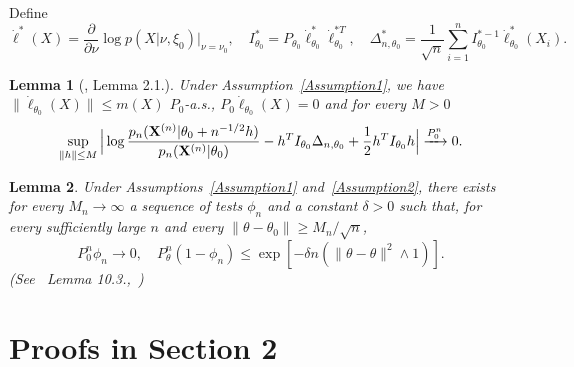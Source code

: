 \documentclass[11pt]{article}
\theoremstyle{plain}
\newtheorem{lemma}{\quad\quad Lemma}
\theoremstyle{definition}
\theoremstyle{remark}
\begin{document}
\begin{appendices}

    Define
$$\dot{\ell}^*(X)=\frac{\partial}{\partial \nu}\log p(X|\nu,\xi_0)\Big|_{\nu=\nu_0}, \quad I^*_{\theta_0}=P_{\theta_0}\dot{\ell}_{\theta_0}^*\dot{\ell}_{\theta_0}^{*T},\quad \Delta_{n,\theta_0}^*
=\frac{1}{\sqrt{n}}\sum_{i=1}^n I_{\theta_0}^{*-1}\dot{\ell}^{*}_{\theta_0}(X_i).
$$

\begin{lemma}[\cite{Kleijn2012The}, Lemma 2.1.]\label{Thm:localExpansion}
    Under Assumption~\ref{Assumption1},
    we have $\|\dot{\ell}_{\theta_0}(X)\|\leq m(X)$ $P_0$-a.s., $P_0 \dot{\ell}_{\theta_0}(X)=0$ and for every $M>0$
    \begin{equation*}
        \sup_{\|h\|\leq M}\Big|
         \log \frac{p_n(\mathbf{X}^{(n)}|\theta_0+n^{-1/2}h)}{p_n(\mathbf{X}^{(n)}|\theta_0)}-h^T I_{\theta_0}\Delta_{n,\theta_0}+\frac{1}{2}h^T I_{\theta_0}h
        \Big|\xrightarrow{P^n_0}0.
    \end{equation*}
\end{lemma}

\begin{lemma}\label{Thm:someTest}
    Under Assumptions~\ref{Assumption1} and~\ref{Assumption2},
    there exists for every $M_n\to \infty$ a sequence of tests $\phi_n$ and a constant $\delta>0$ such that, for every sufficiently large $n$ and every $\|\theta-\theta_0\|\geq M_n/\sqrt{n}$,
    $$
    P^n_{0} \phi_n\to 0,\quad
    P^n_{\theta} (1-\phi_n)\leq \exp[-\delta n(\|\theta-\theta\|^2\wedge 1)].
    $$
    (See~\cite{van2000asymptotic} Lemma 10.3.,~\cite{Kleijn2012The})
\end{lemma}
    \section{Proofs in Section 2}


\end{appendices}
\end{document}
